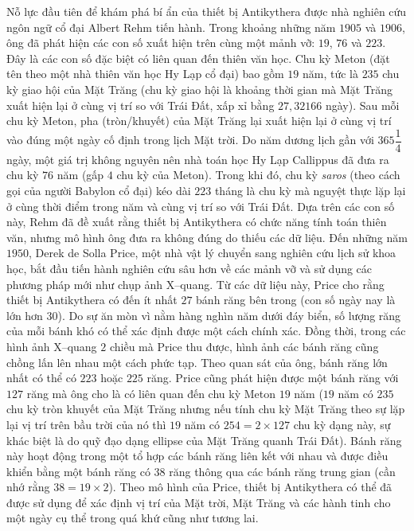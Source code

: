 \begin{multicols}{2}
	Nỗ lực đầu tiên để khám phá bí ẩn của thiết bị Antikythera được nhà nghiên cứu ngôn ngữ cổ đại Albert Rehm tiến hành. Trong khoảng những năm $1905$ và $1906$, ông đã phát hiện các con số xuất hiện trên cùng một mảnh vỡ: $19$, $76$ và $223$. Đây là các con số đặc biệt có liên quan đến thiên văn học. Chu kỳ Meton (đặt tên theo một nhà thiên văn học Hy Lạp cổ đại) bao gồm $19$ năm, tức là $235$ chu kỳ giao hội của Mặt Trăng (chu kỳ giao hội là khoảng thời gian mà Mặt Trăng xuất hiện lại ở cùng vị trí so với Trái Đất, xấp xỉ bằng $27{,}32166$ ngày). Sau mỗi chu kỳ Meton, pha (tròn/khuyết) của Mặt Trăng lại xuất hiện lại ở cùng vị trí vào đúng một ngày cố định trong lịch Mặt trời. Do năm dương lịch gần với $365\dfrac{1}{4}$ ngày, một giá trị không nguyên nên nhà toán học Hy Lạp Callippus đã đưa ra chu kỳ $76$ năm (gấp $4$ chu kỳ của Meton). Trong khi đó, chu kỳ \textit{saros} (theo cách gọi của người Babylon cổ đại) kéo dài $223$ tháng là chu kỳ mà nguyệt thực lặp lại ở cùng thời điểm trong năm và cùng vị trí so với Trái Đất. Dựa trên các con số này, Rehm đã đề xuất rằng thiết bị Antikythera có chức năng tính toán thiên văn, nhưng mô hình ông đưa ra không đúng do thiếu các dữ liệu.
	\vskip 0.1cm
	Đến những năm $1950$, Derek de Solla Price, một nhà vật lý chuyển sang nghiên cứu lịch sử khoa học, bắt đầu tiến hành nghiên cứu sâu hơn về các mảnh vỡ và sử dụng các phương pháp mới như chụp ảnh X--quang. Từ các dữ liệu này, Price cho rằng thiết bị Antikythera có đến ít nhất $27$ bánh răng bên trong (con số ngày nay là lớn hơn $30$). Do sự ăn mòn vì nằm hàng nghìn năm dưới đáy biển, số lượng răng của mỗi bánh khó có thể xác định được một cách chính xác. Đồng thời, trong các hình ảnh X--quang $2$ chiều mà Price thu được, hình ảnh các bánh răng cũng chồng lấn lên nhau một cách phức tạp. Theo quan sát của ông, bánh răng lớn nhất có thể có $223$ hoặc $225$ răng. Price cũng phát hiện được một bánh răng với $127$ răng mà ông cho là có liên quan đến chu kỳ Meton $19$ năm ($19$ năm có $235$ chu kỳ tròn khuyết của Mặt Trăng nhưng nếu tính chu kỳ Mặt Trăng theo sự lặp lại vị trí trên bầu trời của nó thì $19$ năm có $254=2\times127$ chu kỳ dạng này, sự khác biệt là do quỹ đạo dạng ellipse của Mặt Trăng quanh Trái Đất). Bánh răng này hoạt động trong một tổ hợp các bánh răng liên kết với nhau và được điều khiển bằng một bánh răng có $38$ răng thông qua các bánh răng trung gian (cần nhớ rằng $38=19\times2$). Theo mô hình của Price, thiết bị Antikythera có thể đã được sử dụng để xác định vị trí của Mặt trời, Mặt Trăng và các hành tinh cho một ngày cụ thể trong quá khứ cũng như tương lai.

\end{multicols}
